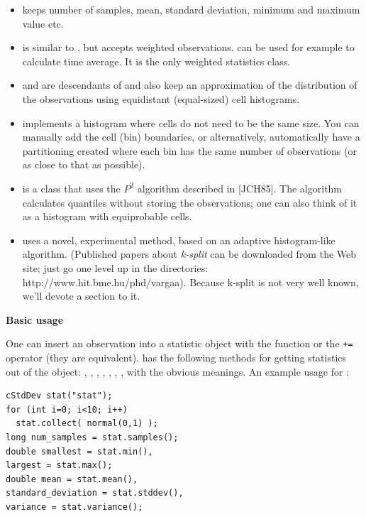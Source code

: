 \begin{itemize}
  \item{ keeps number of samples, mean, standard
    deviation, minimum and maximum value etc.}
  \item{ is similar to , but
    accepts weighted observations.  can be used
    for example to calculate time average. It is the only weighted
    statistics class.}
  \item{ and  are
    descendants of  and also keep an approximation of
    the distribution of the observations using equidistant
    (equal-sized) cell histograms.}
  \item{ implements a histogram where cells do not
    need to be the same size. You can manually add the cell (bin)
    boundaries, or alternatively, automatically have a partitioning
    created where each bin has the same number of observations (or as
    close to that as possible).}
  \item{ is a class that uses the $P^{2}$ algorithm
    described in [JCH85]. The algorithm calculates quantiles without
    storing the observations; one can also think of it as a histogram
    with equiprobable cells.}
  \item{ uses a novel, experimental method, based on an
    adaptive histogram-like algorithm. (Published papers about
    \textit{k-split} can be downloaded from the {\opp}
    Web site; just go one level up in the directories:
    http://www.hit.bme.hu/phd/vargaa). Because k-split is not very
    well known, we'll devote a section to it.}
\end{itemize}

\textbf{Basic usage}


One can insert an observation into a statistic object with the
 function or the \texttt{+=} operator (they are
equivalent).   has the following methods for getting
statistics out of the object: , ,
, , , ,
,  with the obvious meanings. An example
usage for :

\begin{verbatim}
cStdDev stat("stat");
for (int i=0; i<10; i++)
  stat.collect( normal(0,1) );
long num_samples = stat.samples();
double smallest = stat.min(),
largest = stat.max();
double mean = stat.mean(),
standard_deviation = stat.stddev(),
variance = stat.variance();
\end{verbatim}






